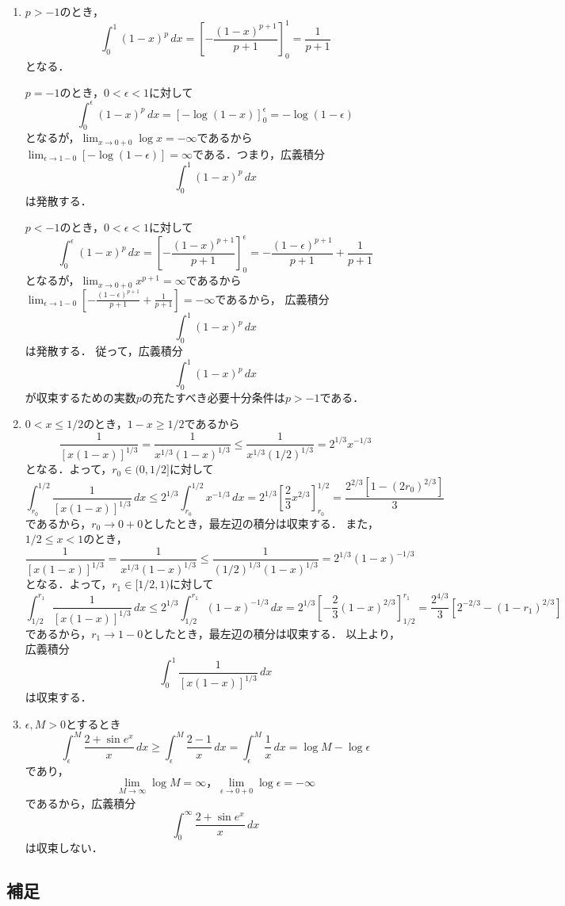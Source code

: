 \documentclass{jsarticle}
\theoremstyle{definition}
\begin{document}
\begin{enumerate}
\item$p>-1$のとき，
\[ \int_0^1(1-x)^p\,dx=\left[-\frac{(1-x)^{p+1}}{p+1}\right]_0^1=\frac{1}{p+1} \]
となる．

$p=-1$のとき，$0<\epsilon<1$に対して
\[ \int_0^\epsilon(1-x)^p\,dx=\left[-\log(1-x)\right]_0^\epsilon=-\log(1-\epsilon) \]
となるが，$\lim_{x\to0+0}\log{x}=-\infty$であるから
$\lim_{\epsilon\to1-0}[-\log(1-\epsilon)]=\infty$である．つまり，広義積分
\[ \int_0^1(1-x)^p\,dx \]
は発散する．

$p<-1$のとき，$0<\epsilon<1$に対して
\[ \int_0^\epsilon(1-x)^p\,dx=\left[-\frac{(1-x)^{p+1}}{p+1}\right]_0^\epsilon
=-\frac{(1-\epsilon)^{p+1}}{p+1}+\frac{1}{p+1} \]
となるが，$\lim_{x\to0+0}x^{p+1}=\infty$であるから
$\lim_{\epsilon\to1-0}[-\frac{(1-\epsilon)^{p+1}}{p+1}+\frac{1}{p+1}]=-\infty$であるから，
広義積分
\[ \int_0^1(1-x)^p\,dx \]
は発散する．
従って，広義積分
\[ \int_0^1(1-x)^p\,dx \]
が収束するための実数$p$の充たすべき必要十分条件は$p>-1$である．

\item$0<x\leq1/2$のとき，$1-x\geq1/2$であるから
\[ \frac{1}{[x(1-x)]^{1/3}}=\frac{1}{x^{1/3}(1-x)^{1/3}}
\leq\frac{1}{x^{1/3}(1/2)^{1/3}}=2^{1/3}x^{-1/3} \]
となる．よって，$r_0\in(0,1/2]$に対して
\[ \int_{r_0}^{1/2}\frac{1}{[x(1-x)]^{1/3}}\,dx
\leq2^{1/3}\int_{r_0}^{1/2}x^{-1/3}\,dx
=2^{1/3}\left[\frac{2}{3}x^{2/3}\right]_{r_0}^{1/2}
=\frac{2^{2/3}[1-(2r_0)^{2/3}]}{3} \]
であるから，$r_0\to0+0$としたとき，最左辺の積分は収束する．
また，$1/2\leq x<1$のとき，
\[ \frac{1}{[x(1-x)]^{1/3}}=\frac{1}{x^{1/3}(1-x)^{1/3}}
\leq\frac{1}{(1/2)^{1/3}(1-x)^{1/3}}=2^{1/3}(1-x)^{-1/3} \]
となる．よって，$r_1\in[1/2,1)$に対して
\[ \int_{1/2}^{r_1}\frac{1}{[x(1-x)]^{1/3}}\,dx
\leq2^{1/3}\int_{1/2}^{r_1}(1-x)^{-1/3}\,dx
=2^{1/3}\left[-\frac{2}{3}(1-x)^{2/3}\right]_{1/2}^{r_1}
=\frac{2^{4/3}}{3}[2^{-2/3}-(1-r_1)^{2/3}] \]
であるから，$r_1\to1-0$としたとき，最左辺の積分は収束する．
以上より，広義積分
\[ \int_0^1\frac{1}{[x(1-x)]^{1/3}}\,dx \]
は収束する．

\item$\epsilon,M>0$とするとき
\[ \int_\epsilon^M\frac{2+\sin{e^x}}{x}\,dx
\geq\int_\epsilon^M\frac{2-1}{x}\,dx
=\int_\epsilon^M\frac{1}{x}\,dx
=\log{M}-\log{\epsilon} \]
であり，
\[ \lim_{M\to\infty}\log{M}=\infty，\lim_{\epsilon\to0+0}\log{\epsilon}=-\infty \]
であるから，広義積分
\[ \int_0^\infty\frac{2+\sin{e^x}}{x}\,dx \]
は収束しない．
\end{enumerate}

\subsection{補足}
\end{document}

